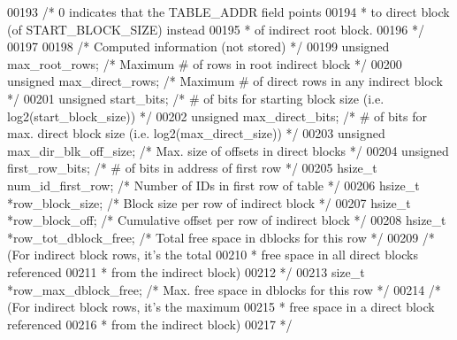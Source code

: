\begin{DoxyCode}
00193                                 \textcolor{comment}{/* 0 indicates that the TABLE\_ADDR field points}
00194 \textcolor{comment}{                                 * to direct block (of START\_BLOCK\_SIZE) instead}
00195 \textcolor{comment}{                                 * of indirect root block.}
00196 \textcolor{comment}{                                 */}
00197 
00198     \textcolor{comment}{/* Computed information (not stored) */}
00199     \textcolor{keywordtype}{unsigned}    max\_root\_rows;      \textcolor{comment}{/* Maximum # of rows in root indirect block */}
00200     \textcolor{keywordtype}{unsigned}    max\_direct\_rows;    \textcolor{comment}{/* Maximum # of direct rows in any indirect block */}
00201     \textcolor{keywordtype}{unsigned}    start\_bits;         \textcolor{comment}{/* # of bits for starting block size (i.e. log2(start\_block\_size)) */}
00202     \textcolor{keywordtype}{unsigned}    max\_direct\_bits;    \textcolor{comment}{/* # of bits for max. direct block size (i.e. log2(max\_direct\_size)) */}
00203     \textcolor{keywordtype}{unsigned}    max\_dir\_blk\_off\_size;   \textcolor{comment}{/* Max. size of offsets in direct blocks */}
00204     \textcolor{keywordtype}{unsigned}    first\_row\_bits;     \textcolor{comment}{/* # of bits in address of first row */}
00205     hsize\_t     num\_id\_first\_row;   \textcolor{comment}{/* Number of IDs in first row of table */}
00206     hsize\_t     *row\_block\_size;    \textcolor{comment}{/* Block size per row of indirect block */}
00207     hsize\_t     *row\_block\_off;     \textcolor{comment}{/* Cumulative offset per row of indirect block */}
00208     hsize\_t     *row\_tot\_dblock\_free;   \textcolor{comment}{/* Total free space in dblocks for this row */}
00209                                     \textcolor{comment}{/* (For indirect block rows, it's the total}
00210 \textcolor{comment}{                                     * free space in all direct blocks referenced}
00211 \textcolor{comment}{                                     * from the indirect block)}
00212 \textcolor{comment}{                                     */}
00213     \textcolor{keywordtype}{size\_t}      *row\_max\_dblock\_free;   \textcolor{comment}{/* Max. free space in dblocks for this row */}
00214                                     \textcolor{comment}{/* (For indirect block rows, it's the maximum}
00215 \textcolor{comment}{                                     * free space in a direct block referenced}
00216 \textcolor{comment}{                                     * from the indirect block)}
00217 \textcolor{comment}{                                     */}

\end{DoxyCode}
